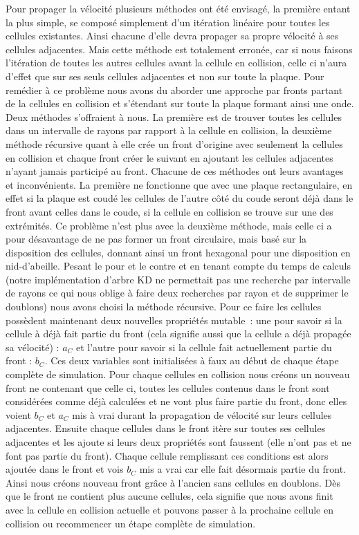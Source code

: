 \documentclass[a4paper,11pt]{article}
\begin{document}
Pour propager la vélocité plusieurs méthodes ont été envisagé, la première entant la plus simple, se composé simplement d'un itération linéaire pour toutes les cellules existantes.
Ainsi chacune d'elle devra propager sa propre vélocité à ses cellules adjacentes.
Mais cette méthode est totalement erronée, car si nous faisons l'itération de toutes les autres cellules avant la cellule en collision, celle ci n'aura d'effet que sur ses seuls cellules adjacentes et non sur toute la plaque.
Pour remédier à ce problème nous avons du aborder une approche par fronts partant de la cellules en collision et s'étendant sur toute la plaque formant ainsi une onde.
Deux méthodes s'offraient à nous. La première est de trouver toutes les cellules dans un intervalle de rayons par rapport à la cellule en collision, la deuxième méthode récursive quant à elle crée un front d'origine avec seulement la cellules en collision et chaque front créer le suivant en ajoutant les cellules adjacentes n'ayant jamais participé au front.
Chacune de ces méthodes ont leurs avantages et inconvénients.
La première ne fonctionne que avec une plaque rectangulaire, en effet si la plaque est coudé les cellules de l'autre côté du coude seront déjà dans le front avant celles dans le coude, si la cellule en collision se trouve sur une des extrémités.
Ce problème n'est plus avec la deuxième méthode, mais celle ci a pour désavantage de ne pas former un front circulaire, mais basé sur la disposition des cellules, donnant ainsi un front hexagonal pour une disposition en nid-d'abeille.
Pesant le pour et le contre et en tenant compte du temps de calculs (notre implémentation d'arbre KD ne permettait pas une recherche par intervalle de rayons ce qui nous oblige à faire deux recherches par rayon et de supprimer le doublons) nous avons choisi la méthode récursive.
Pour ce faire les cellules possèdent maintenant deux nouvelles propriétés mutable~: une pour savoir si la cellule à déjà fait partie du front (cela signifie aussi que la cellule a déjà propagée sa vélocité) : $a_C$ et l'autre pour savoir si la cellule fait actuellement partie du front : $b_C$.
Ces deux variables sont initialisées à faux au début de chaque étape complète de simulation.
Pour chaque cellules en collision nous créons un nouveau front ne contenant que celle ci, toutes les cellules contenus dans le front sont considérées comme déjà calculées et ne vont plus faire partie du front, donc elles voient $b_C$ et $a_C$ mis à vrai durant la propagation de vélocité sur leurs cellules adjacentes.
Ensuite chaque cellules dans le front itère sur toutes ses cellules adjacentes et les ajoute si leurs deux propriétés sont faussent (elle n'ont pas et ne font pas partie du front).
Chaque cellule remplissant ces conditions est alors ajoutée dans le front et vois $b_C$ mis a vrai car elle fait désormais partie du front.
Ainsi nous créons nouveau front grâce à l'ancien sans cellules en doublons.
Dès que le front ne contient plus aucune cellules, cela signifie que nous avons finit avec la cellule en collision actuelle et pouvons passer à la prochaine cellule en collision ou recommencer un étape complète de simulation. \\
\end{document}
